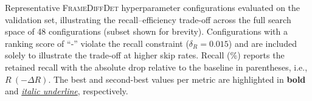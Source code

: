 \begin{table}[hbtp]
    \caption{Representative \textsc{FrameDiffDet} hyperparameter configurations
        evaluated on the validation set, illustrating the recall--efficiency
        trade-off across the full search space of 48 configurations (subset
        shown for brevity). Configurations with a ranking score of ``-'' violate
        the recall constraint ($\delta_R = 0.015$) and are included solely to
        illustrate the trade-off at higher skip rates. Recall (\%) reports the
        retained recall with the absolute drop relative to the baseline in
        parentheses, i.e., $R\ (-\Delta R)$. The best and second-best values per
        metric are highlighted in \textbf{bold} and \underline{\textit{italic
        underline}}, respectively.}
    \label{tb:val_results_frameDiff}
\end{table}
